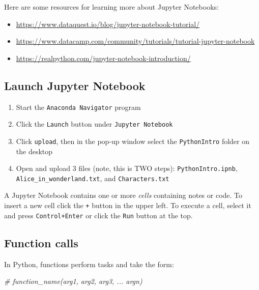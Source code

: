 \documentclass[]{book}
\newenvironment{Shaded}{\begin{snugshade}}{\end{snugshade}}
\newcommand{\CommentTok}[1]{\textcolor[rgb]{0.56,0.35,0.01}{\textit{#1}}}
\providecommand{\tightlist}{%
  \setlength{\itemsep}{0pt}\setlength{\parskip}{0pt}}
\begin{document}
Here are some resources for learning more about Jupyter Notebooks:

\begin{itemize}
\tightlist
\item
  \url{https://www.dataquest.io/blog/jupyter-notebook-tutorial/}
\item
  \url{https://www.datacamp.com/community/tutorials/tutorial-jupyter-notebook}
\item
  \url{https://realpython.com/jupyter-notebook-introduction/}
\end{itemize}

\hypertarget{launch-jupyter-notebook}{%
\subsection{Launch Jupyter Notebook}\label{launch-jupyter-notebook}}

\begin{enumerate}
\def\labelenumi{\arabic{enumi}.}
\tightlist
\item
  Start the \texttt{Anaconda\ Navigator} program
\item
  Click the \texttt{Launch} button under \texttt{Jupyter\ Notebook}
\item
  Click \texttt{upload}, then in the pop-up window select the \texttt{PythonIntro} folder on the desktop
\item
  Open and upload 3 files (note, this is TWO steps): \texttt{PythonIntro.ipnb}, \texttt{Alice\_in\_wonderland.txt}, and \texttt{Characters.txt}
\end{enumerate}

A Jupyter Notebook contains one or more \emph{cells} containing notes or code. To insert a new cell click the \texttt{+} button in the upper left. To execute a cell, select it and press \texttt{Control+Enter} or click the \texttt{Run} button at the top.

\hypertarget{function-calls-1}{%
\subsection{Function calls}\label{function-calls-1}}

In Python, functions perform tasks and take the form:

\begin{Shaded}
\begin{Highlighting}[]
\CommentTok{# function_name(arg1, arg2, arg3, ... argn)}
\end{Highlighting}
\end{Shaded}
\end{document}
